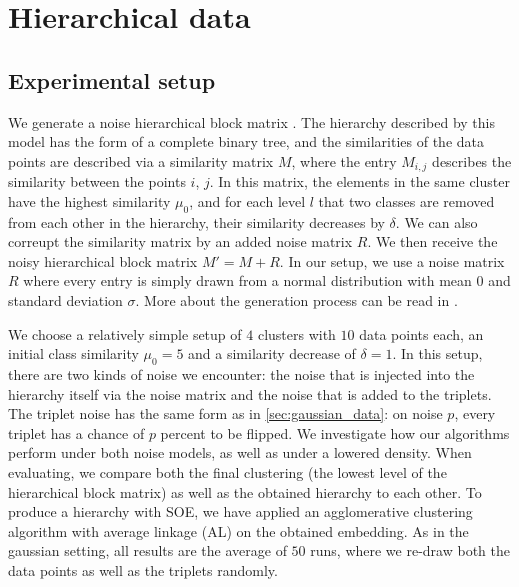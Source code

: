 
\section{Hierarchical data}\label{sec:hierarchical_data}
\subsection{Experimental setup}
We generate a noise hierarchical block matrix \citep{balakrishnanNoiseThresholdsSpectral2011}.
The hierarchy described by this model has the form of a complete binary tree, and the similarities of the data points are described via a similarity matrix $M$, 
where the entry $M_{i,j}$ describes the similarity between the points $i$, $j$.
In this matrix, the elements in the same cluster have the highest similarity $\mu_0$, 
and for each level $l$ that two classes are removed
from each other in the hierarchy, their similarity decreases by $\delta$. 
We can also correupt the similarity matrix by 
an added noise matrix $R$. We then receive the noisy hierarchical block matrix $M' = M + R$. 
In our setup, we use a noise matrix $R$ where every entry is simply drawn from a normal distribution with mean $0$ and standard deviation $\sigma$.
More about the generation process can be read in \cite{ghoshdastidarFoundationsComparisonBasedHierarchical2019}.

We choose a relatively simple setup of $4$ clusters with $10$ data points each, an initial class similarity $\mu_0 = 5$ and a similarity decrease of $\delta = 1$.
In this setup, there are two kinds of noise we encounter: the noise that is injected into the hierarchy itself via the noise matrix and the noise that is added to the triplets.
The triplet noise has the same form as in \autoref{sec:gaussian_data}: on noise $p$, every triplet has a chance of $p$ percent to be flipped. 
We investigate how our algorithms perform under both noise models, as well as under a lowered density.  
When evaluating, we compare both the final clustering (the lowest level of the hierarchical block matrix) as well as the obtained hierarchy to each other. 
To produce a hierarchy with SOE, we have applied an agglomerative clustering algorithm with average linkage (AL) on the obtained embedding.
As in the gaussian setting, all results are the average of $50$ runs, where we re-draw both the data points as well as the triplets randomly. 

